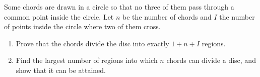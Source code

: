 Some chords are drawn in a circle so that no three of them pass through a common point inside the circle. Let $n$ be the number of chords and $I$ the number of points inside the circle where two of them cross.
\begin{enumerate}
\item[(a)] Prove that the chords divide the disc into exactly $1+n+I$ regions.
\item[(b)] Find the largest number of regions into which $n$ chords can divide a disc, and show that it can be attained.
\end{enumerate}
